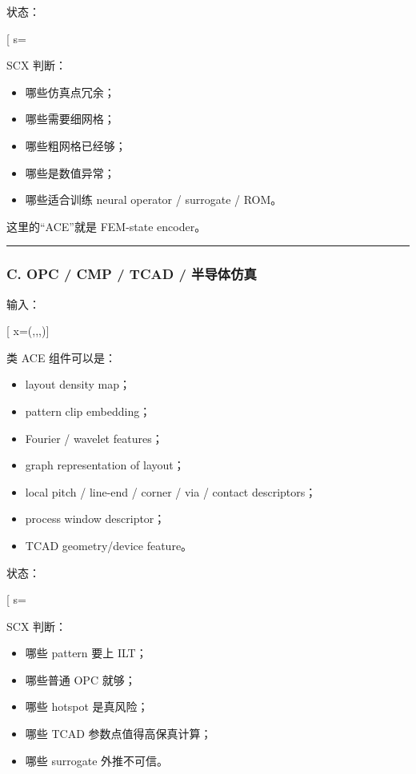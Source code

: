 \documentclass[
  12pt,
]{ctexart}
\providecommand{\tightlist}{%
  \setlength{\itemsep}{0pt}\setlength{\parskip}{0pt}}
\begin{document}
状态：

{[} s=\text{geometry-load-material-mesh state}{]}

SCX 判断：

\begin{itemize}
\tightlist
\item
  哪些仿真点冗余；
\item
  哪些需要细网格；
\item
  哪些粗网格已经够；
\item
  哪些是数值异常；
\item
  哪些适合训练 neural operator / surrogate / ROM。
\end{itemize}

这里的``ACE''就是 FEM-state encoder。

\begin{center}\rule{0.5\linewidth}{0.5pt}\end{center}

\subsubsection{C. OPC / CMP / TCAD /
半导体仿真}\label{c.-opc-cmp-tcad-ux534aux5bfcux4f53ux4effux771f}

输入：

{[}
x=(,,,){]}

类 ACE 组件可以是：

\begin{itemize}
\tightlist
\item
  layout density map；
\item
  pattern clip embedding；
\item
  Fourier / wavelet features；
\item
  graph representation of layout；
\item
  local pitch / line-end / corner / via / contact descriptors；
\item
  process window descriptor；
\item
  TCAD geometry/device feature。
\end{itemize}

状态：

{[} s=\text{layout-process-device state}{]}

SCX 判断：

\begin{itemize}
\tightlist
\item
  哪些 pattern 要上 ILT；
\item
  哪些普通 OPC 就够；
\item
  哪些 hotspot 是真风险；
\item
  哪些 TCAD 参数点值得高保真计算；
\item
  哪些 surrogate 外推不可信。
\end{itemize}
\end{document}
